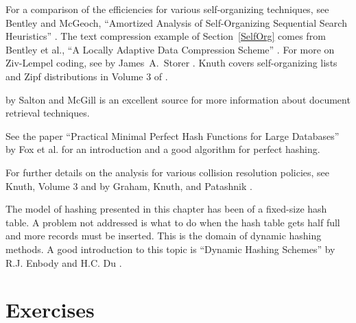 For a comparison of the efficiencies for various self-organizing
techniques, see Bentley and McGeoch,
``Amortized Analysis of Self-Or\-gan\-izing Sequential Search
Heuristics'' \cite{BentOrganize}.
The text compression example of
Section~\ref{SelfOrg} comes from Bentley et al.,
``A Locally Adaptive Data Compression Scheme'' \cite{BentCompress}.
For more on
Ziv-Lempel coding,
see  by
James~A.~Storer \cite{Storer}.
Knuth covers self-organizing lists and
Zipf distributions in Volume 3 of
\cite{KnuthV3}.

 by Salton and
McGill \cite{Salton} is an excellent source for more information about
document retrieval techniques.

See the paper
``Practical Minimal Perfect Hash Functions for Large Data\-bases''
by Fox et al. \cite{PerfHash} for an introduction and
a good algorithm for perfect hashing.

For further details on the analysis for various collision resolution
policies, see Knuth,
Volume 3 \cite{KnuthV3} and
by Graham, Knuth, and Patashnik \cite{ConcreteMath}.

The model of hashing presented in this chapter has been of a
fixed-size hash table.
A problem not addressed is what to do when the hash table gets half
full and more records must be inserted.
This is the domain of
dynamic hashing methods.
A good introduction to this topic is ``Dynamic Hashing Schemes'' by
R.J. Enbody and H.C. Du \cite{DyHash}.

\section{Exercises}

